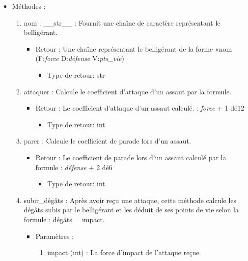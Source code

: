 \documentclass[12pt,pdftex,oneside]{article}
\begin{document}
\begin{itemize}
  \item Méthodes : 

    \begin{enumerate}
    \item nom : \_\_str\_\_ : Fournit une chaîne de caractère représentant le belligérant.
      \begin{itemize}
      \item Retour : Une chaîne représentant le belligérant de la forme «nom
        (F:\emph{force} D:\emph{défense} V:\emph{pts\_vie})
          \begin{itemize}
          \item Type de retour: str
          \end{itemize}
      \end{itemize}

    \item attaquer : Calcule le coefficient d'attaque d'un assaut  par la formule.
      \begin{itemize}
      \item Retour : Le coefficient d'attaque d'un assaut calculé.
        : \emph{force} + 1 dé12
          \begin{itemize}
          \item Type de retour: int
          \end{itemize}
      \end{itemize}

    \item parer : Calcule le coefficient de parade lors d'un assaut.
      \begin{itemize}
      \item Retour : Le coefficient de parade lors d'un assaut calculé par la
        formule : \emph{défense} + 2 dé6
          \begin{itemize}
          \item Type de retour: int
          \end{itemize}
      \end{itemize}

    \item subir\_dégâts : Après avoir reçu une attaque, cette méthode calcule les
      dégâts subis par le belligérant et les déduit de ses points de vie selon
      la formule : dégâts = impact.
      \begin{itemize}
      \item Paramètres : 
        \begin{enumerate}
        \item impact (int) : La force d'impact de l'attaque reçue.
        \end{enumerate}
      \end{itemize}


\end{enumerate}
\end{itemize}
\end{document}
